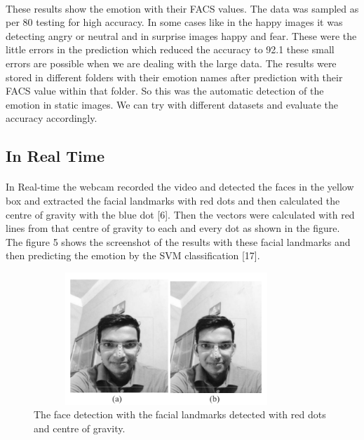 \documentclass[a4paper,12pt,oneside]{article}
\begin{document}
\paragraph{}
These results show the emotion with their FACS values.
The data was sampled as per 80%
testing for high accuracy. In some cases like in the happy
images it was detecting angry or neutral and in surprise
images happy and fear. These were the little errors in the
prediction which reduced the accuracy to 92.1%
these small errors are possible when we are dealing with
the large data. The results were stored in different folders
with their emotion names after prediction with their
FACS value within that folder. So this was the automatic
detection of the emotion in static images. We can try
with different datasets and evaluate the accuracy
accordingly.

\subsection{In Real Time}
\paragraph{}
In Real-time the webcam recorded the video and
detected the faces in the yellow box and extracted the
facial landmarks with red dots and then calculated the
centre of gravity with the blue dot [6]. Then the vectors
were calculated with red lines from that centre of gravity
to each and every dot as shown in the figure. The figure
5 shows the screenshot of the results with these facial
landmarks and then predicting the emotion by the SVM
classification [17].

\begin{figure}[H]
\centering
\includegraphics[height=5cm,width=10cm]{realtime1.jpg}
\caption{The face detection with the facial
landmarks detected with red dots and centre of gravity.}
\end{figure}
\end{document}
